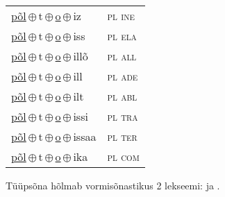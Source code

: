 \begin{minipage}{\textwidth}
\begin{sideways}
\begin{tabular}{l l}
\underline{põl}\,$\oplus$\,t\,$\oplus$\,\underline{o}\,$\oplus$\,iz & \textsc{ pl ine } \\
\underline{põl}\,$\oplus$\,t\,$\oplus$\,\underline{o}\,$\oplus$\,iss & \textsc{ pl ela } \\
\underline{põl}\,$\oplus$\,t\,$\oplus$\,\underline{o}\,$\oplus$\,illõ & \textsc{ pl all } \\
\underline{põl}\,$\oplus$\,t\,$\oplus$\,\underline{o}\,$\oplus$\,ill & \textsc{ pl ade } \\
\underline{põl}\,$\oplus$\,t\,$\oplus$\,\underline{o}\,$\oplus$\,ilt & \textsc{ pl abl } \\
\underline{põl}\,$\oplus$\,t\,$\oplus$\,\underline{o}\,$\oplus$\,issi & \textsc{ pl tra } \\
\underline{põl}\,$\oplus$\,t\,$\oplus$\,\underline{o}\,$\oplus$\,issaa & \textsc{ pl ter } \\
\underline{põl}\,$\oplus$\,t\,$\oplus$\,\underline{o}\,$\oplus$\,ika & \textsc{ pl com } \\
\end{tabular}
\end{sideways}
\label{tab:tüüpsõnamall-põlto}

\end{minipage}

 
\vspace{1em}
\noindent Tüüpsõna hõlmab vormisõnastikus 2 lekseemi:  ja .
